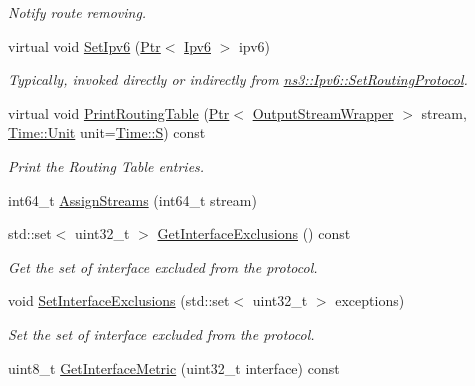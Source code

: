 \begin{DoxyCompactItemize}
\begin{DoxyCompactList}\small\item\em Notify route removing. \end{DoxyCompactList}\item 
virtual void \hyperlink{classns3_1_1RipNg_acd8e0a2b2453a28ecd4154729e45d324}{Set\+Ipv6} (\hyperlink{classns3_1_1Ptr}{Ptr}$<$ \hyperlink{classns3_1_1Ipv6}{Ipv6} $>$ ipv6)
\begin{DoxyCompactList}\small\item\em Typically, invoked directly or indirectly from \hyperlink{classns3_1_1Ipv6_aa889d2174527a1df773d65974de83f8f}{ns3\+::\+Ipv6\+::\+Set\+Routing\+Protocol}. \end{DoxyCompactList}\item 
virtual void \hyperlink{classns3_1_1RipNg_aec30027ca8085a46d680b98291e27480}{Print\+Routing\+Table} (\hyperlink{classns3_1_1Ptr}{Ptr}$<$ \hyperlink{classns3_1_1OutputStreamWrapper}{Output\+Stream\+Wrapper} $>$ stream, \hyperlink{classns3_1_1Time_a87a7f4d29c68b047a72d291ad660295a}{Time\+::\+Unit} unit=\hyperlink{classns3_1_1Time_a87a7f4d29c68b047a72d291ad660295aade8622b06524a328cd3a59db6ccf76af}{Time\+::S}) const 
\begin{DoxyCompactList}\small\item\em Print the Routing Table entries. \end{DoxyCompactList}\item 
int64\+\_\+t \hyperlink{classns3_1_1RipNg_a98e8ebdf17fdb302e0619246b88954a5}{Assign\+Streams} (int64\+\_\+t stream)
\item 
std\+::set$<$ uint32\+\_\+t $>$ \hyperlink{classns3_1_1RipNg_a5ad1b90a1ca236c9d51ee4ecba9aafe1}{Get\+Interface\+Exclusions} () const 
\begin{DoxyCompactList}\small\item\em Get the set of interface excluded from the protocol. \end{DoxyCompactList}\item 
void \hyperlink{classns3_1_1RipNg_a4dce40799b2b372ef7fc31901d8b5114}{Set\+Interface\+Exclusions} (std\+::set$<$ uint32\+\_\+t $>$ exceptions)
\begin{DoxyCompactList}\small\item\em Set the set of interface excluded from the protocol. \end{DoxyCompactList}\item 
uint8\+\_\+t \hyperlink{classns3_1_1RipNg_a964ec14240c70f31176307334c00b936}{Get\+Interface\+Metric} (uint32\+\_\+t interface) const 

\end{DoxyCompactItemize}
